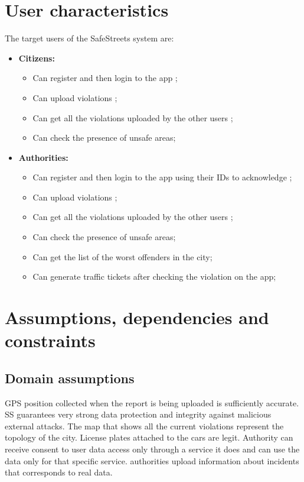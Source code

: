 \documentclass[../RASD.tex]{subfiles}
\begin{document}
    \section{User characteristics}\label{sec:user-characteristics}
    The target users of the SafeStreets system are:
    \begin{itemize}
        \item \textbf{Citizens:}
        \begin{itemize}
            \item Can register and then login to the app ;
            \item Can upload violations ;
            \item Can get all the violations uploaded by the other users ;
            \item Can check the presence of unsafe areas;
        \end{itemize}
        \item \textbf{Authorities:}
        \begin{itemize}
            \item Can register and then login to the app using their IDs to acknowledge ;
            \item Can upload violations ;
            \item Can get all the violations uploaded by the other users ;
            \item Can check the presence of unsafe areas;
            \item Can get the list of the worst offenders in the city;
            \item Can generate traffic tickets after checking the violation on the app;
        \end{itemize}
    \end{itemize}
    \section{Assumptions, dependencies and constraints}\label{sec:assumptions,-dependencies-and-constraints}
    \subsection{Domain assumptions}\label{subsec:domain-assumpiton}
    \begin{enumerate}
         GPS position collected when the report is being uploaded is sufficiently accurate.
        SS guarantees very strong data protection and integrity against malicious external attacks.
         The map that shows all the current violations represent the topology of the city.
         License plates attached to the cars are legit.
        Authority can receive consent to user data access only through a service it does and can use the data only for that specific service.
        authorities upload information about incidents that corresponds to real data.
    \end{enumerate}
\end{document}
